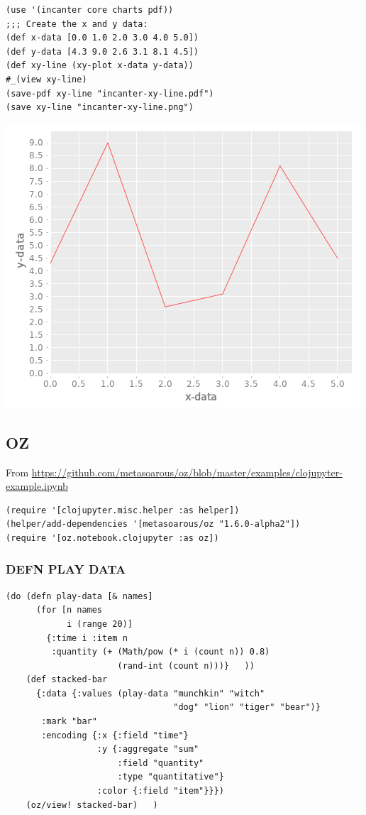 \documentclass[10pt,oneside,x11names]{article}
\begin{document}
\begin{verbatim}
(use '(incanter core charts pdf))
;;; Create the x and y data:
(def x-data [0.0 1.0 2.0 3.0 4.0 5.0])
(def y-data [4.3 9.0 2.6 3.1 8.1 4.5])
(def xy-line (xy-plot x-data y-data))
#_(view xy-line)
(save-pdf xy-line "incanter-xy-line.pdf")
(save xy-line "incanter-xy-line.png")
\end{verbatim}

\begin{center}
\includegraphics[width=.9\linewidth]{incanter-xy-line.png}
\end{center}

\subsection{OZ}
\label{sec:orgbc11037}

From
\url{https://github.com/metasoarous/oz/blob/master/examples/clojupyter-example.ipynb}

\begin{verbatim}
(require '[clojupyter.misc.helper :as helper])
(helper/add-dependencies '[metasoarous/oz "1.6.0-alpha2"])
(require '[oz.notebook.clojupyter :as oz])
\end{verbatim}

\subsubsection{DEFN PLAY DATA}
\label{sec:orgb8924d5}

\begin{verbatim}
(do (defn play-data [& names]
      (for [n names
            i (range 20)]
        {:time i :item n
         :quantity (+ (Math/pow (* i (count n)) 0.8)
                      (rand-int (count n)))}   ))
    (def stacked-bar
      {:data {:values (play-data "munchkin" "witch"
                                 "dog" "lion" "tiger" "bear")}
       :mark "bar"
       :encoding {:x {:field "time"}
                  :y {:aggregate "sum"
                      :field "quantity"
                      :type "quantitative"}
                  :color {:field "item"}}})
    (oz/view! stacked-bar)   )
\end{verbatim}
\end{document}
